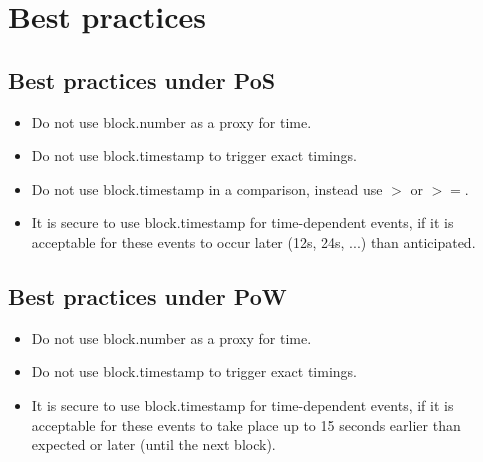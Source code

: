 %
%
%
%

\newpage
\section{Best practices}
\subsection{Best practices under PoS}
\begin{itemize}
  \item Do not use block.number as a proxy for time.
  \item Do not use block.timestamp to trigger exact timings.
  \item Do not use block.timestamp in a comparison, instead use $>$ or $>=$.
  \item It is secure to use block.timestamp for time-dependent events, if it is acceptable for these events to occur later (12s, 24s, ...) than anticipated. \\
\end{itemize}

\subsection{Best practices under PoW}
\begin{itemize}
  \item Do not use block.number as a proxy for time.
  \item Do not use block.timestamp to trigger exact timings.
  \item It is secure to use block.timestamp for time-dependent events, if it is acceptable for these events to take place up to 15 seconds earlier than expected or later (until the next block). \\
\end{itemize}

